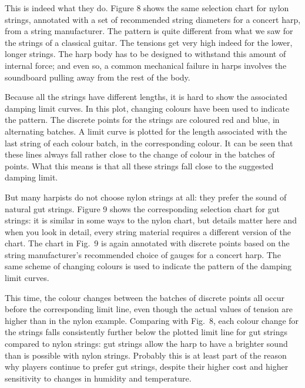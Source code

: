   This is indeed what they do. Figure 8 shows the same selection chart for 
  nylon strings, annotated with a set of recommended string diameters for a 
  concert harp, from a string manufacturer. The pattern is quite different from 
  what we saw for the strings of a classical guitar. The tensions get very high 
  indeed for the lower, longer strings. The harp body has to be designed to 
  withstand this amount of internal force; and even so, a common mechanical 
  failure in harps involves the soundboard pulling away from the rest of the 
  body. 


  Because all the strings have different lengths, it is hard to show the 
  associated damping limit curves. In this plot, changing colours have been 
  used to indicate the pattern. The discrete points for the strings are 
  coloured red and blue, in alternating batches. A limit curve is plotted for 
  the length associated with the last string of each colour batch, in the 
  corresponding colour. It can be seen that these lines always fall rather 
  close to the change of colour in the batches of points. What this means is 
  that all these strings fall close to the suggested damping limit. 

  But many harpists do not choose nylon strings at all: they prefer the sound 
  of natural gut strings. Figure 9 shows the corresponding selection chart for 
  gut strings: it is similar in some ways to the nylon chart, but details 
  matter here and when you look in detail, every string material requires a 
  different version of the chart. The chart in Fig.\ 9 is again annotated with 
  discrete points based on the string manufacturer's recommended choice of 
  gauges for a concert harp. The same scheme of changing colours is used to 
  indicate the pattern of the damping limit curves. 


  This time, the colour changes between the batches of discrete points all 
  occur before the corresponding limit line, even though the actual values of 
  tension are higher than in the nylon example. Comparing with Fig.\ 8, each 
  colour change for the strings falls consistently further below the plotted 
  limit line for gut strings compared to nylon strings: gut strings allow the 
  harp to have a brighter sound than is possible with nylon strings. Probably 
  this is at least part of the reason why players continue to prefer gut 
  strings, despite their higher cost and higher sensitivity to changes in 
  humidity and temperature. 


